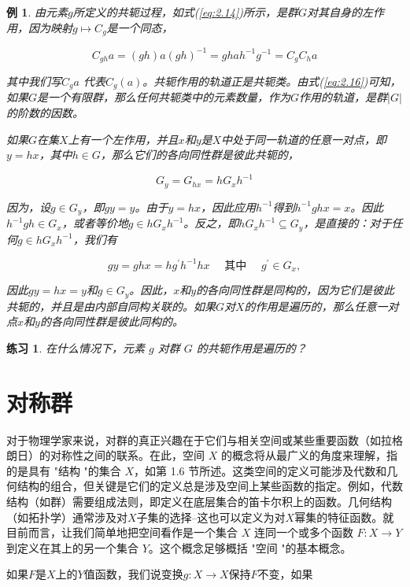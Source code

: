 \documentclass[hyperref,UTF8]{ctexbook}
\newtheorem{eg}{例}[chapter]
\newtheorem*{exercise}{练习}
\begin{document}
\begin{eg}
由元素$g$所定义的共轭过程，如式(\ref{eq:2.14})所示，是群$G$对其自身的左作用，因为映射$g \mapsto C_{g}$是一个同态，

$$
C_{g h} a=(g h) a(g h)^{-1}=g h a h^{-1} g^{-1}=C_{g} C_{h} a
$$

其中我们写$C_{g} a$ 代表$C_{g}(a)$。共轭作用的轨道正是共轭类。由式(\ref{eq:2.16})可知，如果$G$是一个有限群，那么任何共轭类中的元素数量，作为$G$作用的轨道，是群$|G|$的阶数的因数。

如果$G$在集$X$上有一个左作用，并且$x$和$y$是$X$中处于同一轨道的任意一对点，即$y=h x$，其中$h \in G$，那么它们的各向同性群是彼此共轭的，


\begin{equation}
    G_{y}=G_{h x}=h G_{x} h^{-1}
\end{equation}

因为，设$g \in G_{y}$，即$g y=y$。由于$y=h x$，因此应用$h^{-1}$得到$h^{-1} g h x=x$。因此$h^{-1} g h \in G_{x}$，或者等价地$g \in h G_{x} h^{-1}$。反之，即$h G_{x} h^{-1} \subseteq G_{y}$，是直接的：对于任何$g \in h G_{x} h^{-1}$，我们有

$$
g y=g h x=h g^{\prime} h^{-1} h x \quad \text { 其中 } \quad g^{\prime} \in G_{x},
$$

因此$g y=h x=y$和$g \in G_{y}$。因此，$x$和$y$的各向同性群是同构的，因为它们是彼此共轭的，并且是由内部自同构关联的。如果$G$对$X$的作用是遍历的，那么任意一对点$x$和$y$的各向同性群是彼此同构的。
\end{eg}
\begin{exercise}
    在什么情况下，元素 $g$ 对群 $G$ 的共轭作用是遍历的？
\end{exercise}

\section{对称群}
对于物理学家来说，对群的真正兴趣在于它们与相关空间或某些重要函数（如拉格朗日）的对称性之间的联系。在此，空间 $X$ 的概念将从最广义的角度来理解，指的是具有 "结构 "的集合 $X$，如第 1.6 节所述。这类空间的定义可能涉及代数和几何结构的组合，但关键是它们的定义总是涉及空间上某些函数的指定。例如，代数结构（如群）需要组成法则，即定义在底层集合的笛卡尔积上的函数。几何结构（如拓扑学）通常涉及对$X$子集的选择--这也可以定义为对$X$幂集的特征函数。就目前而言，让我们简单地把空间看作是一个集合 $X$ 连同一个或多个函数 $F: X \rightarrow Y$ 到定义在其上的另一个集合 $Y$。这个概念足够概括 "空间 "的基本概念。

如果$F$是$X$上的$Y$值函数，我们说变换$g: X \rightarrow X$保持$F$不变，如果
\end{document}
